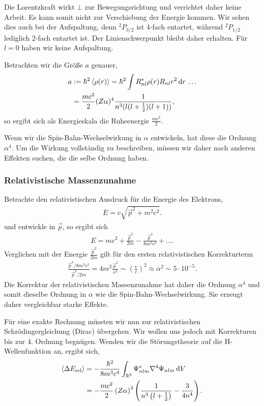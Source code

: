 Die Lorentzkraft wirkt $\bot$ zur Bewegungsrichtung und verrichtet daher keine
Arbeit. Es kann somit nicht zur Verschiebung der Energie kommen. Wir sehen
dies auch bei der Aufspaltung, denn ${}^2 P_{3/2}$ ist 4-fach entartet, während
${}^2P_{1/2}$ lediglich 2-fach entartet ist. Der Linienschwerpunkt bleibt daher
erhalten. Für $l=0$ haben wir keine Aufspaltung.

Betrachten wir die Größe $a$ genauer,
\begin{align*}
a&:= \hbar^2 \left\langle\rho(r)\right\rangle = \hbar^2 \int R_{nl}^* \rho(r) R_{nl} r^2\,\mathrm{d} r\,
\ldots\\ &= \frac{mc^2}{2}(Z\alpha)^4 \frac{1}{n^3(l(l+\frac{1}{2})(l+1))},
\end{align*}
so ergibt sich als Energieskala die Ruheenergie $\frac{mc^2}{2}$.

Wenn wir die Spin-Bahn-Wechselwirkung in $\alpha$ entwickeln, hat diese die
Ordnung $\alpha^4$. Um die Wirkung vollständig zu beschreiben, müssen wir daher nach
anderen Effekten suchen, die die selbe Ordnung haben.

\subsubsection{Relativistische Massenzunahme}

Betrachte den relativistischen Ausdruck für die Energie des Elektrons,
\begin{align*}
E = c\sqrt{\vec{p}^2 + m^2 c^2}.
\end{align*}
und entwickle in $\vec{p}$, so ergibt sich
\begin{align*}
E = mc^2 + \frac{\vec{p}^2}{2m} - \frac{\vec{p}^4}{8m^3 c^2} + \ldots.
\end{align*}
Verglichen mit der Energie $\frac{\vec{p}^2}{2m}$ gilt für den ersten
relativistischen Korrekturterm
\begin{align*}
\frac{\vec{p}^4/8m^3 c^2}{\vec{p}^2/2m} = 4m^2\frac{\vec{p}^2}{c^2}
\sim
\left(\frac{v}{c}\right)^2 \approx \alpha^2 \sim 5\cdot 10^{-5}.
\end{align*}
Die Korrektur der relativistischen Massenzunahme hat daher die Ordnung
$\alpha^4$ und somit dieselbe Ordnung in $\alpha$ wie die
Spin-Bahn-Wechselwirkung. Sie erzeugt daher vergleichbar starke Effekte.

Für eine exakte Rechnung müssten wir nun zur relativistischen
Schrödingergleichung (Dirac) übergehen. Wir wollen uns jedoch mit Korrekturen
bis zur 4. Ordnung begnügen. Wenden wir die Störungstheorie auf die
H-Wellenfunktion an, ergibt sich,
\begin{align*}
\left\langle\Delta E_{\text{rel}}\right\rangle &= -\frac{\hbar^2}{8m^3c^4}\int_{\mathbb{R}^3} \Psi_{nlm}^*
\nabla^4 \Psi_{nlm} \,\mathrm{d} V\, \\
 &=
-\frac{mc^2}{2}\left(Z\alpha\right)^4\left(\frac{1}{n^3\left(l
+ \frac{1}{2}\right)} - \frac{3}{4n^4}\right).
\end{align*}

